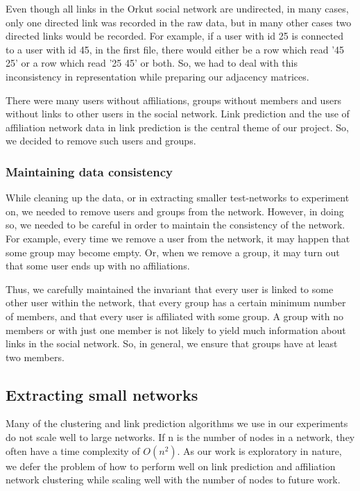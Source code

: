 \documentclass{report}
\begin{document}
Even though all links in the Orkut social network are undirected, in many cases, only one directed link was recorded in the raw data, but in many other cases two directed links would be recorded. For example, if a user with id 25 is connected to a user with id 45, in the first file, there would either be a row which read '45 25' or a row which read '25 45' or both. So, we had to deal with this inconsistency in representation while preparing our adjacency matrices.

There were many users without affiliations, groups without members and users without links to other users in the social network. Link prediction and the use of affiliation network data in link prediction is the central theme of our project. So, we decided to remove such users and groups.

\subsubsection{Maintaining data consistency}
While cleaning up the data, or in extracting smaller test-networks to experiment on, we needed to remove users and groups from the network. However, in doing so, we needed to be careful in order to maintain the consistency of the network. For example, every time we remove a user from the network, it may happen that some group may become empty. Or, when we remove a group, it may turn out that some user ends up with no affiliations.

Thus, we carefully maintained the invariant that every user is linked to some other user within the network, that every group has a certain minimum number of members, and that every user is affiliated with some group. A group with no members or with just one member is not likely to yield much information about links in the social network. So, in general, we ensure that groups have at least two members.

\subsection{Extracting small networks}
Many of the clustering and link prediction algorithms we use in our experiments do not scale well to large networks. If n is the number of nodes in a network, they often have a time complexity of $O(n^{2})$. As our work is exploratory in nature, we defer the problem of how to perform well on link prediction and affiliation network clustering while scaling well with the number of nodes to future work.
\end{document}
